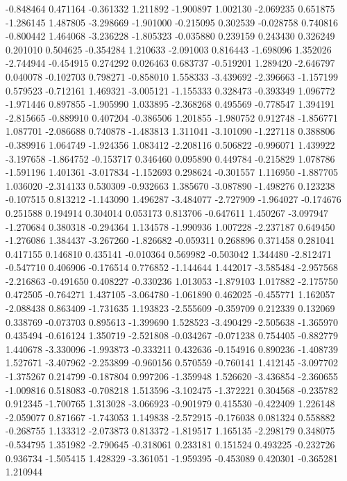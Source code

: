 -0.848464
0.471164
-0.361332
1.211892
-1.900897
1.002130
-2.069235
0.651875
-1.286145
1.487805
-3.298669
-1.901000
-0.215095
0.302539
-0.028758
0.740816
-0.800442
1.464068
-3.236228
-1.805323
-0.035880
0.239159
0.243430
0.326249
0.201010
0.504625
-0.354284
1.210633
-2.091003
0.816443
-1.698096
1.352026
-2.744944
-0.454915
0.274292
0.026463
0.683737
-0.519201
1.289420
-2.646797
0.040078
-0.102703
0.798271
-0.858010
1.558333
-3.439692
-2.396663
-1.157199
0.579523
-0.712161
1.469321
-3.005121
-1.155333
0.328473
-0.393349
1.096772
-1.971446
0.897855
-1.905990
1.033895
-2.368268
0.495569
-0.778547
1.394191
-2.815665
-0.889910
0.407204
-0.386506
1.201855
-1.980752
0.912748
-1.856771
1.087701
-2.086688
0.740878
-1.483813
1.311041
-3.101090
-1.227118
0.388806
-0.389916
1.064749
-1.924356
1.083412
-2.208116
0.506822
-0.996071
1.439922
-3.197658
-1.864752
-0.153717
0.346460
0.095890
0.449784
-0.215829
1.078786
-1.591196
1.401361
-3.017834
-1.152693
0.298624
-0.301557
1.116950
-1.887705
1.036020
-2.314133
0.530309
-0.932663
1.385670
-3.087890
-1.498276
0.123238
-0.107515
0.813212
-1.143090
1.496287
-3.484077
-2.727909
-1.964027
-0.174676
0.251588
0.194914
0.304014
0.053173
0.813706
-0.647611
1.450267
-3.097947
-1.270684
0.380318
-0.294364
1.134578
-1.990936
1.007228
-2.237187
0.649450
-1.276086
1.384437
-3.267260
-1.826682
-0.059311
0.268896
0.371458
0.281041
0.417155
0.146810
0.435141
-0.010364
0.569982
-0.503042
1.344480
-2.812471
-0.547710
0.406906
-0.176514
0.776852
-1.144644
1.442017
-3.585484
-2.957568
-2.216863
-0.491650
0.408227
-0.330236
1.013053
-1.879103
1.017882
-2.175750
0.472505
-0.764271
1.437105
-3.064780
-1.061890
0.462025
-0.455771
1.162057
-2.088438
0.863409
-1.731635
1.193823
-2.555609
-0.359709
0.212339
0.132069
0.338769
-0.073703
0.895613
-1.399690
1.528523
-3.490429
-2.505638
-1.365970
0.435494
-0.616124
1.350719
-2.521808
-0.034267
-0.071238
0.754405
-0.882779
1.440678
-3.330096
-1.993873
-0.333211
0.432636
-0.154916
0.890236
-1.408739
1.527671
-3.407962
-2.253899
-0.960156
0.570559
-0.760141
1.412145
-3.097702
-1.375267
0.214799
-0.187804
0.997206
-1.359948
1.526620
-3.436854
-2.360655
-1.009816
0.518083
-0.708218
1.513596
-3.102475
-1.372221
0.304568
-0.235782
0.912345
-1.700765
1.313028
-3.066923
-0.901979
0.415530
-0.422409
1.226148
-2.059077
0.871667
-1.743053
1.149838
-2.572915
-0.176038
0.081324
0.558882
-0.268755
1.133312
-2.073873
0.813372
-1.819517
1.165135
-2.298179
0.348075
-0.534795
1.351982
-2.790645
-0.318061
0.233181
0.151524
0.493225
-0.232726
0.936734
-1.505415
1.428329
-3.361051
-1.959395
-0.453089
0.420301
-0.365281
1.210944
